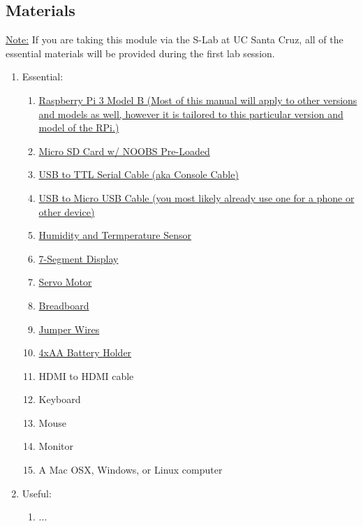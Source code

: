 \documentclass{article}
\begin{document}
  \subsection{Materials}
  \label{sec:materials}
    \underline{Note:} If you are taking this module via the S-Lab at UC Santa Cruz, all of the essential materials will be provided during the first lab session.
    \begin{enumerate}

      \item Essential:
      \begin{enumerate}
        \item \hyperref[sec:vendor-rpi]{Raspberry Pi 3 Model B (Most of this manual will apply to other versions and models as well, however it is tailored to this particular version and model of the RPi.)}
        \item \hyperref[sec:vendor-sd]{Micro SD Card w/ NOOBS Pre-Loaded}
        \item \hyperref[sec:vendor-usbttlserial]{USB to TTL Serial Cable (aka Console Cable)}
        \item \hyperref[sec:vendor-usbmusb]{USB to Micro USB Cable (you most likely already use one for a phone or other device)}
        \item \hyperref[sec:vendor-sensor]{Humidity and Termperature Sensor}
        \item \hyperref[sec:vendor-7seg]{7-Segment Display}
        \item \hyperref[sec:vendor-servo]{Servo Motor}
        \item \hyperref[sec:vendor-breadboard]{Breadboard}
        \item \hyperref[sec:vendor-wires]{Jumper Wires}
        \item \hyperref[sec:vendor-batholder]{4xAA Battery Holder}
        \item HDMI to HDMI cable
        \item Keyboard
        \item Mouse
        \item Monitor
        \item A Mac OSX, Windows, or Linux computer
      \end{enumerate}

      \item Useful:
      \begin{enumerate}
        \item ...
      \end{enumerate}
    \end{enumerate}
\end{document}
